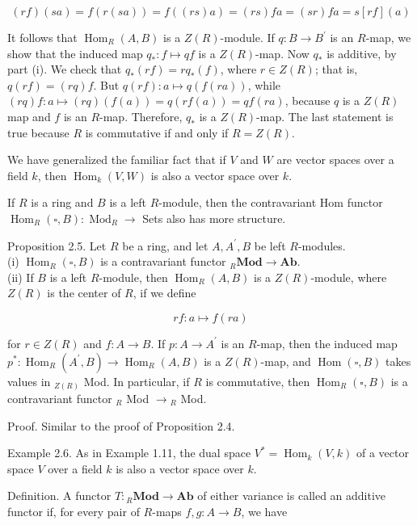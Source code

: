 \documentclass[10pt]{article}
\begin{document}
$$
(r f)(s a)=f(r(s a))=f((r s) a)=(r s) f a=(s r) f a=s[r f](a)
$$

It follows that $\operatorname{Hom}_{R}(A, B)$ is a $Z(R)$-module. If $q: B \rightarrow B^{\prime}$ is an $R$-map, we show that the induced map $q_{*}: f \mapsto q f$ is a $Z(R)$-map. Now $q_{*}$ is additive, by part (i). We check that $q_{*}(r f)=r q_{*}(f)$, where $r \in Z(R)$; that is, $q(r f)=(r q) f$. But $q(r f): a \mapsto q(f(r a))$, while\\
$(r q) f: a \mapsto(r q)(f(a))=q(r f(a))=q f(r a)$, because $q$ is a $Z(R)$ map and $f$ is an $R$-map. Therefore, $q_{*}$ is a $Z(R)$-map. The last statement is true because $R$ is commutative if and only if $R=Z(R)$.

We have generalized the familiar fact that if $V$ and $W$ are vector spaces over a field $k$, then $\operatorname{Hom}_{k}(V, W)$ is also a vector space over $k$.

If $R$ is a ring and $B$ is a left $R$-module, then the contravariant Hom functor $\operatorname{Hom}_{R}(\square, B): \operatorname{Mod}_{R} \rightarrow$ Sets also has more structure.

Proposition 2.5. Let $R$ be a ring, and let $A, A^{\prime}, B$ be left $R$-modules.\\
(i) $\operatorname{Hom}_{R}(\square, B)$ is a contravariant functor ${ }_{R} \mathbf{M o d} \rightarrow \mathbf{A b}$.\\
(ii) If $B$ is a left $R$-module, then $\operatorname{Hom}_{R}(A, B)$ is a $Z(R)$-module, where $Z(R)$ is the center of $R$, if we define

$$
r f: a \mapsto f(r a)
$$

for $r \in Z(R)$ and $f: A \rightarrow B$. If $p: A \rightarrow A^{\prime}$ is an $R$-map, then the induced map $p^{*}: \operatorname{Hom}_{R}\left(A^{\prime}, B\right) \rightarrow \operatorname{Hom}_{R}(A, B)$ is a $Z(R)$-map, and $\operatorname{Hom}(\square, B)$ takes values in ${ }_{Z(R)}$ Mod. In particular, if $R$ is commutative, then $\operatorname{Hom}_{R}(\square, B)$ is a contravariant functor ${ }_{R}$ Mod $\rightarrow{ }_{R}$ Mod.

Proof. Similar to the proof of Proposition 2.4.

Example 2.6. As in Example 1.11, the dual space $V^{*}=\operatorname{Hom}_{k}(V, k)$ of a vector space $V$ over a field $k$ is also a vector space over $k$.

Definition. A functor $T:{ }_{R} \mathbf{M o d} \rightarrow \mathbf{A b}$ of either variance is called an additive functor if, for every pair of $R$-maps $f, g: A \rightarrow B$, we have
\end{document}
